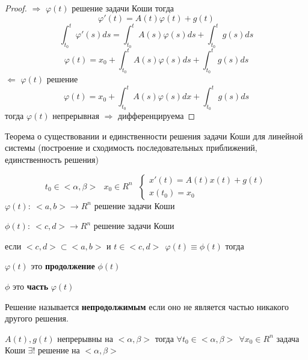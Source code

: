 \begin{proof}
  $\Rightarrow$ $\varphi(t)$ решение задачи Коши тогда
  $$
  \varphi'(t) = A(t)\varphi(t) + g(t)
  $$
  $$
  \int_{t_0}^t \varphi'(s)ds = \int_{t_0}^t A(s) \varphi(s)ds +
  \int_{t_0}^t g(s) ds
  $$
  $$
  \varphi(t) = x_0 + \int_{t_0}^t A(s) \varphi(s) ds  + \int_{t_0}^t g(s)ds
  $$
  $\Leftarrow$ $\varphi(t)$ решение
  $$
  \varphi(t) = x_0 + \int_{t_0}^t A(s)\varphi(s)dx +
  \int_{t_0}^t g(s)ds
  $$
  тогда $\varphi(t)$ непрерывная $\Rightarrow$ дифференцируема
\end{proof}

\begin{title}[\Large]
  Теорема о существовании и единственности решения задачи Коши для линейной
  системы (построение и сходимость последовательных приближений,
  единственность решения)
\end{title}

\begin{block}
  $$
  t_0 \in <\alpha, \beta> ~~~ x_0 \in R^n ~~~
  \left\{
  \begin{array}{l}
    x'(t) = A(t)x(t) + g(t) \\
    x(t_0) = x_0
  \end{array}
  \right.
  $$
  $\varphi(t) : ~ <a,b> \to R^n$ решение задачи Коши

  $\phi(t) : ~ <c,d> \to R^n$  решение задачи Коши

  если $<c,d> \subset<a,b>$ и $t \in <c,d> ~~ \varphi(t) \equiv \phi(t)$ тогда

  $\varphi(t)$ это {\bfseries продолжение} $\phi(t)$

  $\phi$ это {\bfseries часть} $\varphi(t)$

  Решение называется {\bfseries непродолжимым} если оно не является частью никакого
  другого решения.
\end{block}

\begin{theorem}
  $A(t), g(t)$ непрерывны на $<\alpha, \beta>$ тогда
  $\forall t_0 \in <\alpha, \beta> ~~ \forall x_0 \in R^n$ задача Коши
  $\exists !$ решение на $<\alpha, \beta>$
\end{theorem}

